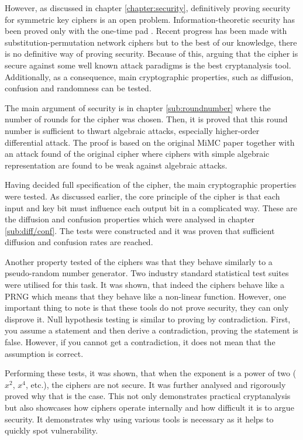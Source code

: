 \documentclass{Resources/UoBLab1}
\theoremstyle{definition}
\begin{document}
However, as discussed in chapter \ref{chapter:security}, definitively proving security for symmetric key ciphers is an open problem. Information-theoretic security has been proved only with the one-time pad \cite{OneTime}. Recent progress has been made with substitution-permutation network ciphers but to the best of our knowledge, there is no definitive way of proving security. Because of this, arguing that the cipher is secure against some well known attack paradigms is the best cryptanalysis tool. Additionally, as a consequence, main cryptographic properties, such as diffusion, confusion and randomness can be tested.

The main argument of security is in chapter \ref{sub:roundnumber} where the number of rounds for the cipher was chosen. Then, it is proved that this round number is sufficient to thwart algebraic attacks, especially higher-order differential attack. The proof is based on the original MiMC paper\cite{MiMC} together with an attack found of the original cipher\cite{MiMCAttack} where ciphers with simple algebraic representation are found to be weak against algebraic attacks.

Having decided full specification of the cipher, the main cryptographic properties were tested. As discussed earlier, the core principle of the cipher is that each input and key bit must influence each output bit in a complicated way. These are the diffusion and confusion properties which were analysed in chapter \ref{sub:diff/conf}. The tests were constructed and it was proven that sufficient diffusion and confusion rates are reached.

Another property tested of the ciphers was that they behave similarly to a pseudo-random number generator. Two industry standard statistical test suites were utilised for this task. It was shown, that indeed the ciphers behave like a PRNG which means that they behave like a non-linear function. However, one important thing to note is that these tools do not prove security, they can only disprove it. Null hypothesis testing is similar to proving by contradiction. First, you assume a statement and then derive a contradiction, proving the statement is false. However, if you cannot get a contradiction, it does not mean that the assumption is correct.

Performing these tests, it was shown, that when the exponent is a power of two ($x^2$, $x^4$, etc.), the ciphers are not secure. It was further analysed and rigorously proved why that is the case. This not only demonstrates practical cryptanalysis but also showcases how ciphers operate internally and how difficult it is to argue security. It demonstrates why using various tools is necessary as it helps to quickly spot vulnerability.
\end{document}
